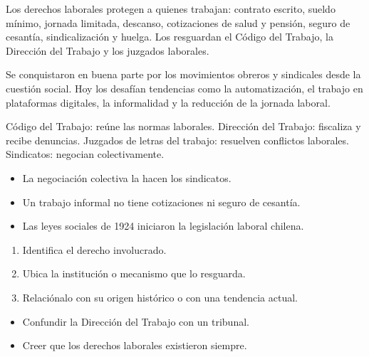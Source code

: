 \documentclass[10pt,a4paper,twocolumn]{article}
\begin{document}
Los derechos laborales protegen a quienes trabajan: contrato escrito, sueldo mínimo, jornada limitada, descanso, cotizaciones de salud y pensión, seguro de cesantía, sindicalización y huelga. Los resguardan el Código del Trabajo, la Dirección del Trabajo y los juzgados laborales.

Se conquistaron en buena parte por los movimientos obreros y sindicales desde la cuestión social. Hoy los desafían tendencias como la automatización, el trabajo en plataformas digitales, la informalidad y la reducción de la jornada laboral.

\begin{definicion}[Instituciones]
Código del Trabajo: reúne las normas laborales. Dirección del Trabajo: fiscaliza y recibe denuncias. Juzgados de letras del trabajo: resuelven conflictos laborales. Sindicatos: negocian colectivamente.
\end{definicion}

\begin{ideasclave}
\begin{itemize}
  \item La negociación colectiva la hacen los sindicatos.
  \item Un trabajo informal no tiene cotizaciones ni seguro de cesantía.
  \item Las leyes sociales de 1924 iniciaron la legislación laboral chilena.
\end{itemize}
\end{ideasclave}

\begin{metodo}
\begin{enumerate}
  \item Identifica el derecho involucrado.
  \item Ubica la institución o mecanismo que lo resguarda.
  \item Relaciónalo con su origen histórico o con una tendencia actual.
\end{enumerate}
\end{metodo}

\begin{errorfrecuente}
\begin{itemize}
  \item Confundir la Dirección del Trabajo con un tribunal.
  \item Creer que los derechos laborales existieron siempre.
\end{itemize}
\end{errorfrecuente}
\end{document}
